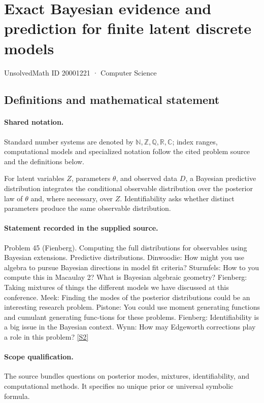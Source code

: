 \documentclass[11pt]{article}
\newcommand{\sref}[2]{\hyperlink{source:#1:#2}{[S#2]}}
\begin{document}
\setcounter{section}{20001220}
\section{Exact Bayesian evidence and prediction for finite latent discrete models}\label{20001221}
{\small\sffamily UnsolvedMath ID 20001221 · Computer Science}
\subsection{Definitions and mathematical statement}

\paragraph{Shared notation.}Standard number systems are denoted by $\mathbb N,\mathbb Z,\mathbb Q,\mathbb R,\mathbb C$; index ranges, computational models and specialized notation follow the cited problem source and the definitions below.


For latent variables $Z$, parameters $\theta$, and observed data $D$, a Bayesian predictive distribution integrates the conditional observable distribution over the posterior law of $\theta$ and, where necessary, over $Z$. Identifiability asks whether distinct parameters produce the same observable distribution.
\paragraph{Statement recorded in the supplied source.}
Problem 45 (Fienberg). Computing the full distributions for observables using Bayesian extensions. Predictive distributions. Dinwoodie: How might you use algebra to pursue Bayesian directions in model fit criteria? Sturmfels: How to you compute this in Macaulay 2? What is Bayesian algebraic geometry? Fienberg: Taking mixtures of things the different models we have discussed at this conference. Meek: Finding the modes of the posterior distributions could be an interesting research problem. Pistone: You could use moment generating functions and cumulant generating func-tions for these problems. Fienberg: Identifiability is a big issue in the Bayesian context. Wynn: How may Edgeworth corrections play a role in this problem? \sref{20001221}{2}
\paragraph{Scope qualification.}
The source bundles questions on posterior modes, mixtures, identifiability, and computational methods. It specifies no unique prior or universal symbolic formula.
\end{document}
